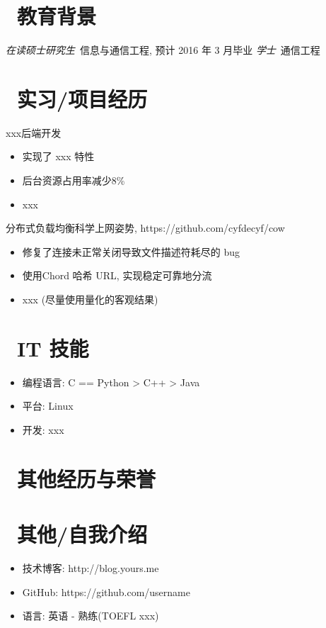 \documentclass{resume}
\begin{document}
\section{\faGraduationCap\  教育背景}
\textit{在读硕士研究生}\ 信息与通信工程, 预计 2016 年 3 月毕业
\textit{学士}\ 通信工程

\section{\faUsers\ 实习/项目经历}
xxx后端开发
\begin{itemize}
  \item 实现了 xxx 特性
  \item 后台资源占用率减少8\%
  \item xxx
\end{itemize}

\begin{onehalfspacing}
分布式负载均衡科学上网姿势, https://github.com/cyfdecyf/cow
\begin{itemize}
  \item 修复了连接未正常关闭导致文件描述符耗尽的 bug
  \item 使用Chord 哈希 URL, 实现稳定可靠地分流
  \item xxx (尽量使用量化的客观结果)
\end{itemize}
\end{onehalfspacing}

\section{\faCogs\ IT 技能}
\begin{itemize}[parsep=0.5ex]
  \item 编程语言: C == Python > C++ > Java
  \item 平台: Linux
  \item 开发: xxx
\end{itemize}

\section{\faHeartO\ 其他经历与荣誉}

\section{\faInfo\ 其他/自我介绍}
\begin{itemize}[parsep=0.5ex]
  \item 技术博客: http://blog.yours.me
  \item GitHub: https://github.com/username
  \item 语言: 英语 - 熟练(TOEFL xxx)
\end{itemize}
\end{document}
